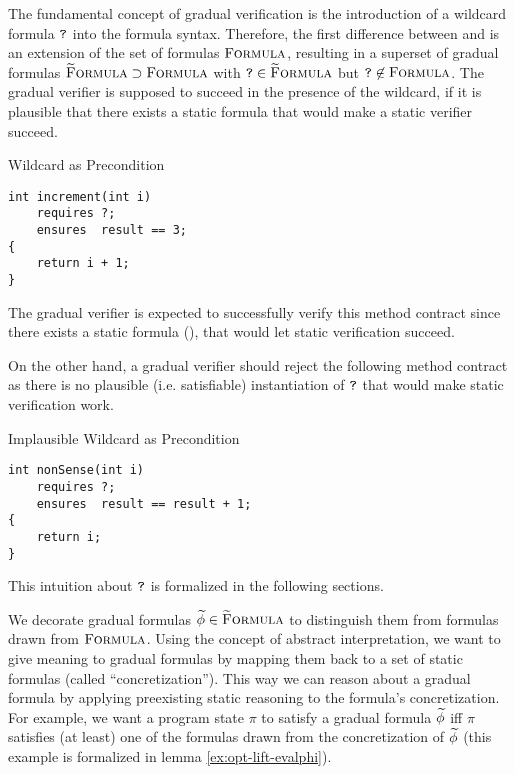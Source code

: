 
The fundamental concept of gradual verification is the introduction of a wildcard formula $\textup{\texttt{?}}$ into the formula syntax.
Therefore, the first difference between \gvl and \svl is an extension of the set of formulas $\textup{\textsc{Formula}}$, resulting in a superset of gradual formulas $\textup{\textsc{\ensuremath{\widetilde{\text{F}}}ormula}} \supset \textup{\textsc{Formula}}$ with $\textup{\texttt{?}} \in \textup{\textsc{\ensuremath{\widetilde{\text{F}}}ormula}}$ but $\textup{\texttt{?}} \not \in \textup{\textsc{Formula}}$.
The gradual verifier is supposed to succeed in the presence of the wildcard, if it is plausible that there exists a static formula that would make a static verifier succeed.
\begin{example}{Wildcard as Precondition}
\begin{lstlisting}
int increment(int i)
    requires ?;
    ensures  result == 3;
{
    return i + 1;
}
\end{lstlisting}
The gradual verifier is expected to successfully verify this method contract since there exists a static formula (), that would let static verification succeed.
\end{example}

On the other hand, a gradual verifier should reject the following method contract as there is no plausible (i.e. satisfiable) instantiation of $\textup{\texttt{?}}$ that would make static verification work.
\begin{example}{Implausible Wildcard as Precondition}
\begin{lstlisting}
int nonSense(int i)
    requires ?;
    ensures  result == result + 1;
{
    return i;
}
\end{lstlisting}
\end{example}

This intuition about $\textup{\texttt{?}}$ is formalized in the following sections.

We decorate gradual formulas $\widetilde{\phi} \in \textup{\textsc{\ensuremath{\widetilde{\text{F}}}ormula}}$ to distinguish them from formulas drawn from $\textup{\textsc{Formula}}$.
Using the concept of abstract interpretation, we want to give meaning to gradual formulas by mapping them back to a set of static formulas (called “concretization”).
This way we can reason about a gradual formula by applying preexisting static reasoning to the formula's concretization.
For example, we want a program state $\pi$ to satisfy a gradual formula $\widetilde{\phi}$ iff $\pi$ satisfies (at least) one of the formulas drawn from the concretization of $\widetilde{\phi}$ (this example is formalized in lemma \ref{ex:opt-lift-evalphi}).

